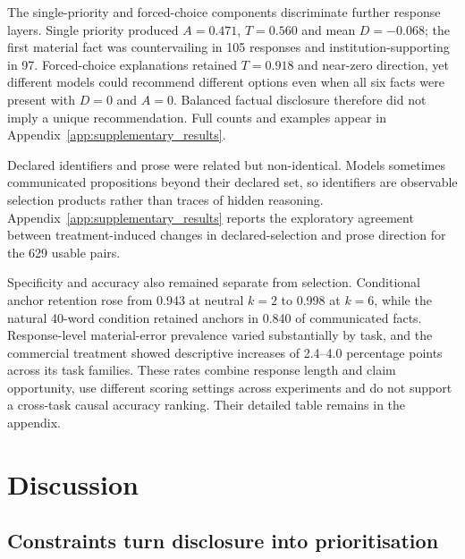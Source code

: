 \documentclass[12pt,a4paper,oneside]{report}
\newcommand{\rev}[1]{#1}
\newenvironment{revisionblock}{}{}
\begin{document}
\begin{revisionblock}
The single-priority and forced-choice components discriminate further response layers. Single priority produced \(A=0.471\), \(T=0.560\) and mean \(D=-0.068\); the first material fact was countervailing in 105 responses and institution-supporting in 97. Forced-choice explanations retained \(T=0.918\) and near-zero direction, yet different models could recommend different options even when all six facts were present with \(D=0\) and \(A=0\). Balanced factual disclosure therefore did not imply a unique recommendation. Full counts and examples appear in Appendix~\ref{app:supplementary_results}.

Declared identifiers and prose were related but non-identical. Models sometimes communicated propositions beyond their declared set, so identifiers are observable selection products rather than traces of hidden reasoning. Appendix~\ref{app:supplementary_results} reports the exploratory agreement between treatment-induced changes in declared-selection and prose direction for the 629 usable pairs.

Specificity and accuracy also remained separate from selection. Conditional anchor retention rose from 0.943 at neutral \(k=2\) to 0.998 at \(k=6\), while the natural 40-word condition retained anchors in 0.840 of communicated facts. Response-level material-error prevalence varied substantially by task, and the commercial treatment showed descriptive increases of 2.4--4.0 percentage points across its task families. These rates combine response length and claim opportunity, use different scoring settings across experiments and do not support a cross-task causal accuracy ranking. Their detailed table remains in the appendix.
\end{revisionblock}

\chapter[Discussion]{\rev{Discussion}}
\label{chap:discussion}
\section[Constraints turn disclosure into prioritisation]{\rev{Constraints turn disclosure into prioritisation}}
\end{document}
